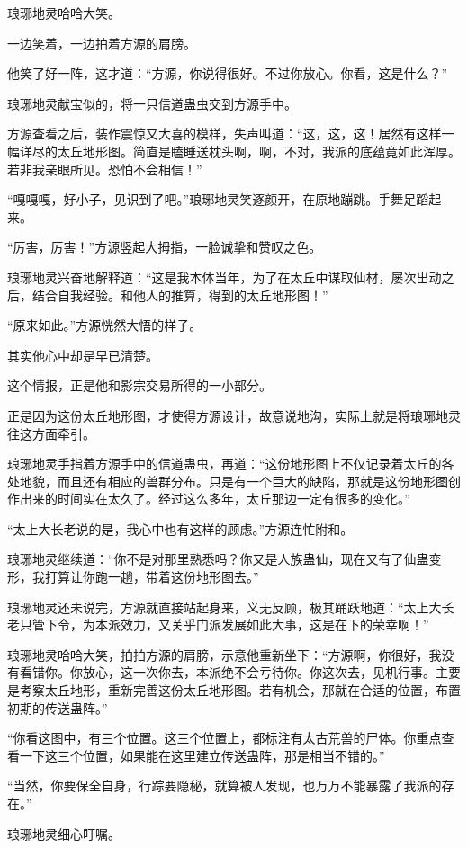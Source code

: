 \begin{this_body}
琅琊地灵哈哈大笑。

一边笑着，一边拍着方源的肩膀。

他笑了好一阵，这才道：“方源，你说得很好。不过你放心。你看，这是什么？”

琅琊地灵献宝似的，将一只信道蛊虫交到方源手中。

方源查看之后，装作震惊又大喜的模样，失声叫道：“这，这，这！居然有这样一幅详尽的太丘地形图。简直是瞌睡送枕头啊，啊，不对，我派的底蕴竟如此浑厚。若非我亲眼所见。恐怕不会相信！”

“嘎嘎嘎，好小子，见识到了吧。”琅琊地灵笑逐颜开，在原地蹦跳。手舞足蹈起来。

“厉害，厉害！”方源竖起大拇指，一脸诚挚和赞叹之色。

琅琊地灵兴奋地解释道：“这是我本体当年，为了在太丘中谋取仙材，屡次出动之后，结合自我经验。和他人的推算，得到的太丘地形图！”

“原来如此。”方源恍然大悟的样子。

其实他心中却是早已清楚。

这个情报，正是他和影宗交易所得的一小部分。

正是因为这份太丘地形图，才使得方源设计，故意说地沟，实际上就是将琅琊地灵往这方面牵引。

琅琊地灵手指着方源手中的信道蛊虫，再道：“这份地形图上不仅记录着太丘的各处地貌，而且还有相应的兽群分布。只是有一个巨大的缺陷，那就是这份地形图创作出来的时间实在太久了。经过这么多年，太丘那边一定有很多的变化。”

“太上大长老说的是，我心中也有这样的顾虑。”方源连忙附和。

琅琊地灵继续道：“你不是对那里熟悉吗？你又是人族蛊仙，现在又有了仙蛊变形，我打算让你跑一趟，带着这份地形图去。”

琅琊地灵还未说完，方源就直接站起身来，义无反顾，极其踊跃地道：“太上大长老只管下令，为本派效力，又关乎门派发展如此大事，这是在下的荣幸啊！”

琅琊地灵哈哈大笑，拍拍方源的肩膀，示意他重新坐下：“方源啊，你很好，我没有看错你。你放心，这一次你去，本派绝不会亏待你。你这次去，见机行事。主要是考察太丘地形，重新完善这份太丘地形图。若有机会，那就在合适的位置，布置初期的传送蛊阵。”

“你看这图中，有三个位置。这三个位置上，都标注有太古荒兽的尸体。你重点查看一下这三个位置，如果能在这里建立传送蛊阵，那是相当不错的。”

“当然，你要保全自身，行踪要隐秘，就算被人发现，也万万不能暴露了我派的存在。”

琅琊地灵细心叮嘱。


\end{this_body}
